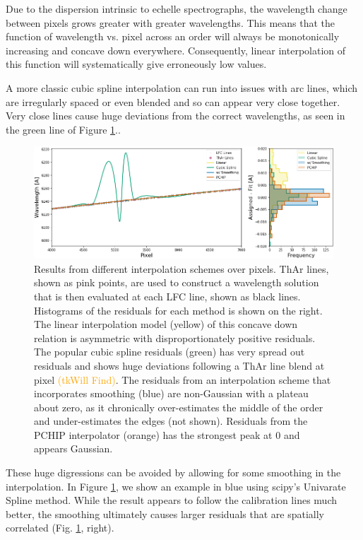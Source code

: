 \documentclass[twocolumn]{aastex63}
\newcommand{\lz}[1]{\textcolor{orange}{#1}}
\begin{document}
Due to the dispersion intrinsic to echelle spectrographs, the wavelength change between pixels grows greater with greater wavelengths.  This means that the function of wavelength vs. pixel across an order will always be monotonically increasing and concave down everywhere.  Consequently, linear interpolation of this function will systematically give erroneously low values.

A more classic cubic spline interpolation can run into issues with arc lines, which are irregularly spaced or even blended and so can appear very close together.  Very close lines cause huge deviations from the correct wavelengths, as seen in the green line of Figure \ref{fig:xinterp}..

\begin{figure}[h]
\centering
\includegraphics[width=\textwidth]{Figures/intpx_tests.png}
\caption{Results from different interpolation schemes over pixels.  ThAr lines, shown as pink points, are used to construct a wavelength solution that is then evaluated at each LFC line, shown as black lines.  Histograms of the residuals for each method is shown on the right.  The linear interpolation model (yellow) of this concave down relation is asymmetric with disproportionately positive residuals.  The popular cubic spline residuals (green) has very spread out residuals and shows huge deviations following a ThAr line blend at pixel \lz{(tkWill Find)}.  The residuals from an interpolation scheme that incorporates smoothing (blue) are non-Gaussian with a plateau about zero, as it chronically over-estimates the middle of the order and under-estimates the edges (not shown).  Residuals from the PCHIP interpolator (orange) has the strongest peak at 0 and appears Gaussian.}
\label{fig:xinterp}
\end{figure} 

These huge digressions can be avoided by allowing for some smoothing in the interpolation.  In Figure \ref{fig:xinterp}, we show an example in blue using scipy's Univarate Spline method.  While the result appears to follow the calibration lines much better, the smoothing ultimately causes larger residuals that are spatially correlated (Fig. \ref{fig:xinterp}, right).
\end{document}
